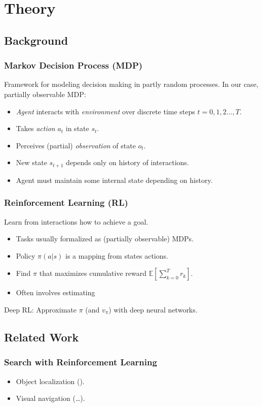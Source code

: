 \section{Theory}

\subsection{Background}

\begin{frame}
    \frametitle{Markov Decision Process (MDP)}
    
    Framework for modeling decision making in partly random processes.
    In our case, partially observable MDP:

    \begin{itemize}
        \item \textit{Agent} interacts with \textit{environment} over discrete time steps \(t = 0, 1, 2\dots, T\).
        \item Takes \textit{action} \(a_t\) in state \(s_t\).
        \item Perceives (partial) \textit{observation} of state \(o_t\).
        \item New state \(s_{t+1}\) depends only on history of interactions.
        \item Agent must maintain some internal state depending on history.
    \end{itemize}

    \begin{figure}
        \centering
        \scalebox{0.75}{}
    \end{figure}
\end{frame}

\begin{frame}
    \frametitle{Reinforcement Learning (RL)}

    Learn from interactions how to achieve a goal.

    \begin{itemize}
        \item Tasks usually formalized as (partially observable) MDPs.
        \item Policy \(\pi(a|s)\) is a mapping from states actions.
        \item Find \(\pi\) that maximizes cumulative reward \(\mathbb{E} \left\lbrack \sum_{k=0}^{T} r_k \right\rbrack\).
        \item Often involves estimating 
    \end{itemize}

    Deep RL: Approximate \(\pi\) (and \(v_\pi\)) with deep neural networks.

\end{frame}

\subsection{Related Work}

\begin{frame}
    \frametitle{Search with Reinforcement Learning}

    \begin{itemize}
        \item Object localization (\cite{caicedo_active_2015,ghesu_artificial_2016,chen_memory_2017}).
        \item Visual navigation (\dots).
    \end{itemize}
\end{frame}